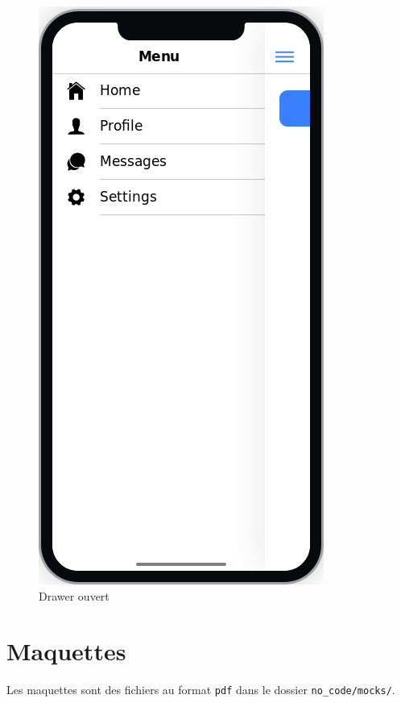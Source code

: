 \documentclass[french]{report}
\begin{document}
\begin{figure}[H]
\begin{minipage}{0.4\textwidth}
        \includegraphics[width=0.7\linewidth]{../imgs/drawer-opened}
        \caption{Drawer ouvert}
    \end{minipage}
\end{figure}

\section{Maquettes}
Les maquettes sont des fichiers au format \verb|pdf| dans le dossier
\verb|no_code/mocks/|.
\end{document}
